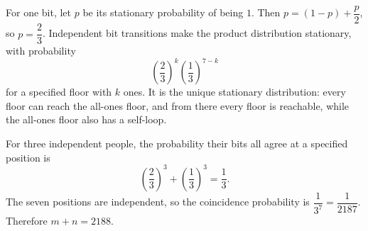 For one bit, let $p$ be its stationary probability of being $1$. Then $p=(1-p)+\dfrac{p}{2}$, so $p=\dfrac{2}{3}$. Independent bit transitions make the product distribution stationary, with probability
\[
\left(\dfrac{2}{3}\right)^k\left(\dfrac{1}{3}\right)^{7-k}
\]
for a specified floor with $k$ ones. It is the unique stationary distribution: every floor can reach the all-ones floor, and from there every floor is reachable, while the all-ones floor also has a self-loop.

For three independent people, the probability their bits all agree at a specified position is
\[
\left(\dfrac{2}{3}\right)^3+\left(\dfrac{1}{3}\right)^3=\dfrac{1}{3}.
\]
The seven positions are independent, so the coincidence probability is $\dfrac{1}{3^7}=\dfrac{1}{2187}$. Therefore $\boxed{m+n=2188}$.
